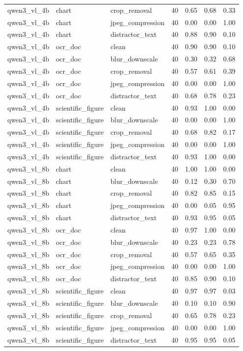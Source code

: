 \documentclass{article}
\begin{document}
\begin{longtable}{llllrrr}
qwen3\_vl\_4b & chart & crop\_removal & 40 & 0.65 & 0.68 & 0.33 \\
qwen3\_vl\_4b & chart & jpeg\_compression & 40 & 0.00 & 0.00 & 1.00 \\
qwen3\_vl\_4b & chart & distractor\_text & 40 & 0.88 & 0.90 & 0.10 \\
qwen3\_vl\_4b & ocr\_doc & clean & 40 & 0.90 & 0.90 & 0.10 \\
qwen3\_vl\_4b & ocr\_doc & blur\_downscale & 40 & 0.30 & 0.32 & 0.68 \\
qwen3\_vl\_4b & ocr\_doc & crop\_removal & 40 & 0.57 & 0.61 & 0.39 \\
qwen3\_vl\_4b & ocr\_doc & jpeg\_compression & 40 & 0.00 & 0.00 & 1.00 \\
qwen3\_vl\_4b & ocr\_doc & distractor\_text & 40 & 0.68 & 0.78 & 0.23 \\
qwen3\_vl\_4b & scientific\_figure & clean & 40 & 0.93 & 1.00 & 0.00 \\
qwen3\_vl\_4b & scientific\_figure & blur\_downscale & 40 & 0.00 & 0.00 & 1.00 \\
qwen3\_vl\_4b & scientific\_figure & crop\_removal & 40 & 0.68 & 0.82 & 0.17 \\
qwen3\_vl\_4b & scientific\_figure & jpeg\_compression & 40 & 0.00 & 0.00 & 1.00 \\
qwen3\_vl\_4b & scientific\_figure & distractor\_text & 40 & 0.93 & 1.00 & 0.00 \\
qwen3\_vl\_8b & chart & clean & 40 & 1.00 & 1.00 & 0.00 \\
qwen3\_vl\_8b & chart & blur\_downscale & 40 & 0.12 & 0.30 & 0.70 \\
qwen3\_vl\_8b & chart & crop\_removal & 40 & 0.82 & 0.85 & 0.15 \\
qwen3\_vl\_8b & chart & jpeg\_compression & 40 & 0.00 & 0.05 & 0.95 \\
qwen3\_vl\_8b & chart & distractor\_text & 40 & 0.93 & 0.95 & 0.05 \\
qwen3\_vl\_8b & ocr\_doc & clean & 40 & 0.97 & 1.00 & 0.00 \\
qwen3\_vl\_8b & ocr\_doc & blur\_downscale & 40 & 0.23 & 0.23 & 0.78 \\
qwen3\_vl\_8b & ocr\_doc & crop\_removal & 40 & 0.57 & 0.65 & 0.35 \\
qwen3\_vl\_8b & ocr\_doc & jpeg\_compression & 40 & 0.00 & 0.00 & 1.00 \\
qwen3\_vl\_8b & ocr\_doc & distractor\_text & 40 & 0.85 & 0.90 & 0.10 \\
qwen3\_vl\_8b & scientific\_figure & clean & 40 & 0.97 & 0.97 & 0.03 \\
qwen3\_vl\_8b & scientific\_figure & blur\_downscale & 40 & 0.10 & 0.10 & 0.90 \\
qwen3\_vl\_8b & scientific\_figure & crop\_removal & 40 & 0.65 & 0.78 & 0.23 \\
qwen3\_vl\_8b & scientific\_figure & jpeg\_compression & 40 & 0.00 & 0.00 & 1.00 \\
qwen3\_vl\_8b & scientific\_figure & distractor\_text & 40 & 0.95 & 0.95 & 0.05 \\
\hline
\end{longtable}
\endgroup
\end{document}
